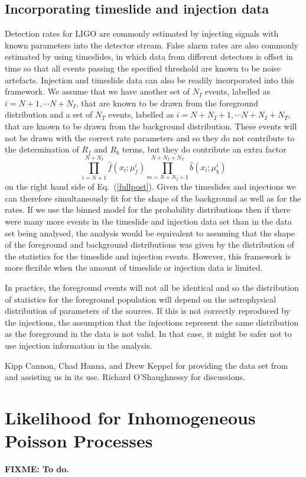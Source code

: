 \documentclass[aps,prd,reprint]{revtex4-1}
\newcommand{\fixme}[1]{\textbf{FIXME: #1}}
\begin{document}
\subsection{Incorporating timeslide and injection data}
Detection rates for LIGO are commonly estimated by injecting signals with known parameters into the detector stream. False alarm rates are also commonly estimated by using timeslides, in which data from different detectors is offset in time so that all events passing the specified threshold are known to be noise artefacts. Injection and timeslide data can also be readily incorporated into this framework. We assume that we have another set of $N_I$ events, labelled as $i=N+1, \cdots N+N_I$, that are known to be drawn from the foreground distribution and a set of $N_T$ events, labelled as $i=N+N_I+1, \cdots N+N_I+N_T$, that are known to be drawn from the background distribution. These events will not be drawn with the correct rate parameters and so they do not contribute to the determination of $R_f$ and $R_b$ terms, but they do contribute an extra factor
\begin{equation}
\prod_{i=N+1}^{N+N_I} \hat{f}(x_i; \mu_f^i) \prod_{m=N+N_I+1}^{N+N_I+N_T} \hat{b}(x_i; \mu_b^i) 
\end{equation}
on the right hand side of Eq.~(\ref{fullpost}). Given the timeslides and injections we can therefore simultaneously fit for the shape of the background as well as for the rates. If we use the binned model for the probability distributions then if there were many more events in the timeslide and injection data set than in the data set being analysed, the analysis would be equivalent to assuming that the shape of the foreground and background distributions was given by the distribution of the statistics for the timeslide and injection events. However, this framework is more flexible when the amount of timeslide or injection data is limited.

In practice, the foreground events will not all be identical and so the distribution of statistics for the foreground population will depend on the astrophysical distribution of parameters of the sources. If this is not correctly reproduced by the injections, the assumption that the injections represent the same distribution as the foreground in the data is not valid. In that case, it might be safer not to use injection information in the analysis. 

\begin{acknowledgments}
  Kipp Cannon, Chad Hanna, and Drew Keppel for providing the data set
  from \citet{Cannon2012} and assisting us in its use. Richard
  O'Shaughnessy for discussions.
\end{acknowledgments}

\appendix

\section{Likelihood for Inhomogeneous Poisson Processes}
\label{sec:likelihood-derivation}

\fixme{To do.}



\end{document}
